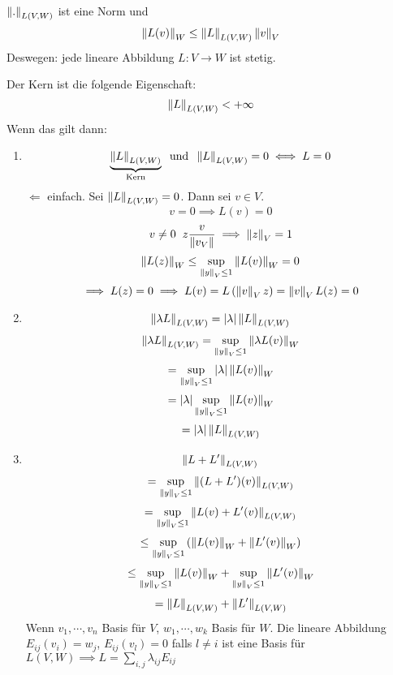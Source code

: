 \begin{Sat}
  $\left\| . \right\|_{L(V,W)}$ ist eine Norm und
  \[\left\| L(v) \right\|_W\leq \left\| L \right\|_{L(V,W)}\left\| v \right\|_V\]
  Deswegen: jede lineare Abbildung $L:V\to W$ ist stetig.
\end{Sat}
\begin{Bew}
  Der Kern ist die folgende Eigenschaft:
  \[\left\| L \right\|_{L(V,W)}<+\infty\]
  Wenn das gilt dann:
  \begin{enumerate}
    \item 
      \[\underbrace{\left\| L \right\|_{L(V,W)}}_\text{Kern}\hspace{2mm}\text{und}\hspace{2mm}\left\| L \right\|_{L(V,W)}=0\iff L=0\]
      $\Leftarrow$ einfach. Sei $\left\| L \right\|_{L(V,W)}=0$. Dann sei $v\in V$.
      \[v=0\implies L(v)=0\]
      \[v\neq 0\hspace{2mm} z\frac{v}{\left\| v_V \right\|}\implies \left\| z \right\|_V=1\]
      \[\left\| L(z) \right\|_W\leq\sup_{\left\| y \right\|_V\leq 1}\left\| L(v) \right\|_W=0\]
      \[\implies L(z)=0\implies L(v)=L\left( \left\| v \right\|_V z \right)=\left\| v \right\|_VL(z)=0\]
    \item
      \[\left\| \lambda L \right\|_{L(V,W)}=\left| \lambda \right|\left\| L \right\|_{L(V,W)}\]
      \[\left\| \lambda L \right\|_{L(V,W)}=\sup_{\left\| y \right\|_V\leq 1}\left\| \lambda L(v) \right\|_W\]
      \[=\sup_{\left\| y \right\|_V\leq 1}\left| \lambda \right|\left\| L(v) \right\|_W\]
      \[=\left| \lambda \right|\sup_{\left\| y \right\|_V\leq 1}\left\| L(v) \right\|_W\]
      \[=\left| \lambda \right|\left\| L \right\|_{L(V,W)}\]
    \item
      \[\left\| L+L' \right\|_{L(V,W)}\]
      \[=\sup_{\left\| y \right\|_V\leq 1}\left\| (L+L')(v) \right\|_{L(V,W)}\]
      \[=\sup_{\left\| y \right\|_V\leq 1}\left\| L(v)+L'(v) \right\|_{L(V,W)}\]
      \[\leq\sup_{\left\| y \right\|_V\leq 1}\left( \left\| L(v) \right\|_W+\left\| L'(v) \right\|_W\right)\]
      \[\leq\sup_{\left\| y \right\|_V\leq 1}\left\| L(v) \right\|_W+\sup_{\left\| y \right\|_V\leq 1}\left\| L'(v) \right\|_W\]
      \[=\left\| L \right\|_{L(V,W)}+\left\| L' \right\|_{L(V,W)}\]
      Wenn $v_1,\cdots,v_n$ Basis für $V$, $w_1,\cdots,w_k$ Basis für $W$. Die lineare Abbildung $E_{ij}(v_i)=w_j$, $E_{ij}(v_l)=0$ falls $l\neq i$ ist eine Basis für $L(V,W)\implies L=\sum_{i,j}\lambda_{ij}E_{ij}$
  \end{enumerate}
\end{Bew}
